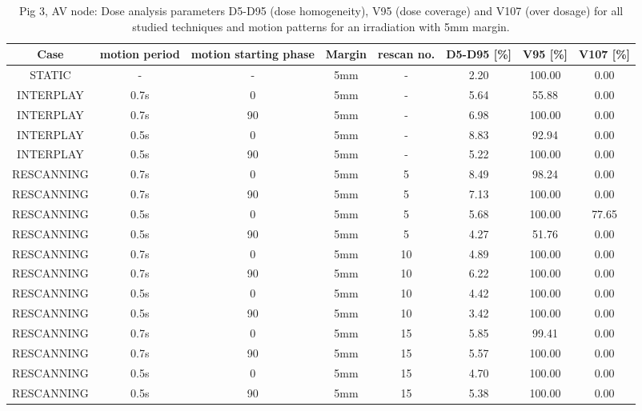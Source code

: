 \documentclass[type=dr, dr=rernat, accentcolor=tud7b,colorbacktitle, bigchapter, openright, twoside, 12pt ]{tudthesis}
\begin{document}
\begin{table}[H]
  \centering
  \tiny
  \caption{Pig 3, AV node: Dose analysis parameters D5-D95 (dose homogeneity), V95 (dose coverage) and V107 (over dosage) for all studied 
  techniques and motion patterns for an irradiation with 5mm margin.}
  \begin{tabular}{|c||c|c|c|c||c|c|c|}
    \hline\hline
    Case & motion period & motion starting phase & Margin & rescan no. & D5-D95 [\%] & V95 [\%] & V107 [\%] \\
    \hline \hline
STATIC & - & - & 5mm & - & 2.20 & 100.00 & 0.00\\
\hline \hline
INTERPLAY & 0.7s & 0 & 5mm & - & 5.64 & 55.88 & 0.00\\
INTERPLAY & 0.7s & 90 & 5mm & - & 6.98 & 100.00 & 0.00\\
INTERPLAY & 0.5s & 0 & 5mm & - & 8.83 & 92.94 & 0.00\\
INTERPLAY & 0.5s & 90 & 5mm & - & 5.22 & 100.00 & 0.00\\
\hline \hline
RESCANNING & 0.7s & 0 & 5mm & 5 & 8.49 & 98.24 & 0.00\\
RESCANNING & 0.7s & 90 & 5mm & 5 & 7.13 & 100.00 & 0.00\\
RESCANNING & 0.5s & 0 & 5mm & 5 & 5.68 & 100.00 & 77.65\\
RESCANNING & 0.5s & 90 & 5mm & 5 & 4.27 & 51.76 & 0.00\\
\hline
RESCANNING & 0.7s & 0 & 5mm & 10 & 4.89 & 100.00 & 0.00\\
RESCANNING & 0.7s & 90 & 5mm & 10 & 6.22 & 100.00 & 0.00\\
RESCANNING & 0.5s & 0 & 5mm & 10 & 4.42 & 100.00 & 0.00\\
RESCANNING & 0.5s & 90 & 5mm & 10 & 3.42 & 100.00 & 0.00\\
\hline
RESCANNING & 0.7s & 0 & 5mm & 15 & 5.85 & 99.41 & 0.00\\
RESCANNING & 0.7s & 90 & 5mm & 15 & 5.57 & 100.00 & 0.00\\
RESCANNING & 0.5s & 0 & 5mm & 15 & 4.70 & 100.00 & 0.00\\
RESCANNING & 0.5s & 90 & 5mm & 15 & 5.38 & 100.00 & 0.00\\
    \hline\hline 
  \end{tabular}
  \label{tab:Pig3_AV}
\end{table}

\vspace*{-0.6cm}
\end{document}
